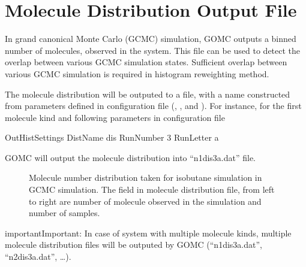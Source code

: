\documentclass[letterpaper,10pt,english]{sphinxmanual}
\begin{document}
\section{Molecule Distribution Output File}
\label{\detokenize{output_file:molecule-distribution-output-file}}
In grand canonical Monte Carlo (GCMC) simulation, GOMC outputs a binned number of molecules, observed
in the system. This file can be used to detect the overlap between various GCMC simulation states.
Sufficient overlap between various GCMC simulation is required in histogram reweighting method.

The molecule distribution will be outputed to a file, with a name constructed from parameters defined
in configuration file (, , and ). For instance, for the first
molecule kind and following parameters in configuration file

\begin{sphinxVerbatim}[commandchars=\\\{\}]
\PYGZsh{}\PYGZsh{}\PYGZsh{}\PYGZsh{}\PYGZsh{}\PYGZsh{}\PYGZsh{}\PYGZsh{}\PYGZsh{}\PYGZsh{}\PYGZsh{}\PYGZsh{}\PYGZsh{}\PYGZsh{}\PYGZsh{}\PYGZsh{}\PYGZsh{}\PYGZsh{}\PYGZsh{}\PYGZsh{}\PYGZsh{}\PYGZsh{}\PYGZsh{}\PYGZsh{}\PYGZsh{}\PYGZsh{}\PYGZsh{}\PYGZsh{}\PYGZsh{}\PYGZsh{}\PYGZsh{}\PYGZsh{}\PYGZsh{}
\PYGZsh{} OutHistSettings
\PYGZsh{}\PYGZsh{}\PYGZsh{}\PYGZsh{}\PYGZsh{}\PYGZsh{}\PYGZsh{}\PYGZsh{}\PYGZsh{}\PYGZsh{}\PYGZsh{}\PYGZsh{}\PYGZsh{}\PYGZsh{}\PYGZsh{}\PYGZsh{}\PYGZsh{}\PYGZsh{}\PYGZsh{}\PYGZsh{}\PYGZsh{}\PYGZsh{}\PYGZsh{}\PYGZsh{}\PYGZsh{}\PYGZsh{}\PYGZsh{}\PYGZsh{}\PYGZsh{}\PYGZsh{}\PYGZsh{}\PYGZsh{}\PYGZsh{}
DistName   dis
RunNumber  3
RunLetter  a
\end{sphinxVerbatim}

GOMC will output the molecule distribution into “n1dis3a.dat” file.

\begin{figure}[htbp]
\centering
\capstart

\noindent{}
\caption{Molecule number distribution taken for isobutane simulation in GCMC simulation. The field in
molecule distribution file, from left to right are number of molecule observed in the
simulation and number of samples.}\label{\detokenize{output_file:id15}}\end{figure}

\begin{sphinxadmonition}{important}{Important:}
In case of system with multiple molecule kinds, multiple molecule distribution files will be
outputed by GOMC (“n1dis3a.dat”, “n2dis3a.dat”, …).
\end{sphinxadmonition}
\end{document}
